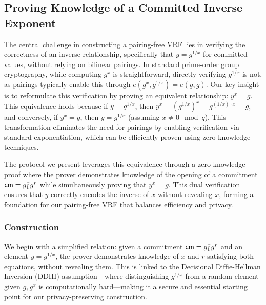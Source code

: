 \subsection{Proving Knowledge of a Committed Inverse Exponent}

The central challenge in constructing a pairing-free VRF lies in verifying the correctness of an inverse relationship, specifically that $y = g^{1/x}$ for committed values, without relying on bilinear pairings. In standard prime-order group cryptography, while computing $g^x$ is straightforward, directly verifying $g^{1/x}$ is not, as pairings typically enable this through $e(g^x, g^{1/x}) = e(g,g)$. Our key insight is to reformulate this verification by proving an equivalent relationship: $y^x = g$. This equivalence holds because if $y = g^{1/x}$, then $y^x = (g^{1/x})^x = g^{(1/x) \cdot x} = g$, and conversely, if $y^x = g$, then $y = g^{1/x}$ (assuming $x \neq 0 \mod q$). This transformation eliminates the need for pairings by enabling verification via standard exponentiation, which can be efficiently proven using zero-knowledge techniques.

The protocol we present leverages this equivalence through a zero-knowledge proof where the prover demonstrates knowledge of the opening of a commitment $\mathsf{cm} = g_1^x g^r$ while simultaneously proving that $y^x = g$. This dual verification ensures that $y$ correctly encodes the inverse of $x$ without revealing $x$, forming a foundation for our pairing-free VRF that balances efficiency and privacy.


\subsubsection{Construction}

We begin with a simplified relation: given a commitment $\mathsf{cm} = g_1^x g^r$ and an element $y = g^{1/x}$, the prover demonstrates knowledge of $x$ and $r$ satisfying both equations, without revealing them. This is linked to the Decisional Diffie-Hellman Inversion (DDHI) assumption—where distinguishing $g^{1/x}$ from a random element given $g, g^x$ is computationally hard—making it a secure and essential starting point for our privacy-preserving construction.


